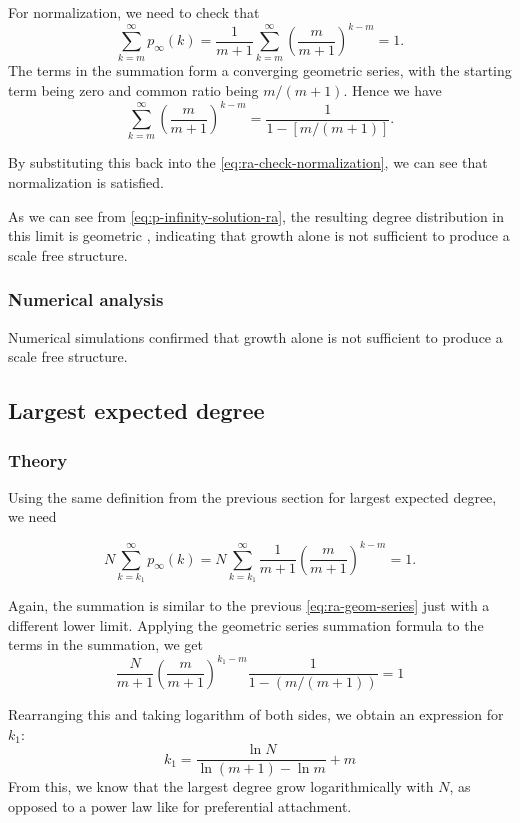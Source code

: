 For normalization, we need to check that 
\begin{equation}
	\sum_{k=m}^{\infty}p_{\infty}(k) = \frac{1}{m+1} \sum_{k=m}^{\infty} \left ( \frac{m}{m+1}\right )^{k-m} = 1.
	\label{eq:ra-check-normalization}
\end{equation}
The terms in the summation form a converging geometric series, with the starting term being zero and common ratio being $m / (m+1)$. Hence we have 
\begin{equation}
	\sum_{k=m}^{\infty} \left ( \frac{m}{m+1} \right )^{k-m} = \frac{1}{1 - [m / (m+1)]}. 
	\label{eq:ra-geom-series}
\end{equation}

By substituting this back into the \autoref{eq:ra-check-normalization}, we can see that normalization is satisfied. 

As we can see from \autoref{eq:p-infinity-solution-ra}, the resulting degree distribution in this limit is geometric \citep{Pekoz2013}, indicating that growth alone is not sufficient to produce a scale free structure. 

\subsubsection{Numerical analysis}\label{subsection:ra-numerical-analysis}
Numerical simulations confirmed that growth alone is not sufficient to produce a scale free structure. 

\subsection{Largest expected degree}\label{subsection:largest-expected-degree}
\subsubsection{Theory}
Using the same definition from the previous section for largest expected degree, we need

\begin{equation}
	N \sum_{k=k_1}^\infty p_{\infty}(k) = N \sum_{k=k_1}^\infty \frac{1}{m+1} \left (\frac{m}{m+1} \right )^{k-m} = 1.
	\label{eq:largest-expected-degree-ra-criteria}
\end{equation}

Again, the summation is similar to the previous \autoref{eq:ra-geom-series} just with a different lower limit. Applying the geometric series summation formula to the terms in the summation, we get 
\begin{equation}
	\frac{N}{m+1} \left ( \frac{m}{m+1} \right )^{k_1 - m} \frac{1}{1 - (m / (m+1))} = 1
\end{equation}

Rearranging this and taking logarithm of both sides, we obtain an expression for $k_1$:
\begin{equation}
	k_1 = \frac{\ln N}{\ln (m+1) - \ln m} + m
	\label{eq:largest-degree-ra}
\end{equation}
From this, we know that the largest degree grow logarithmically with $N$, as opposed to a power law like for preferential attachment. 